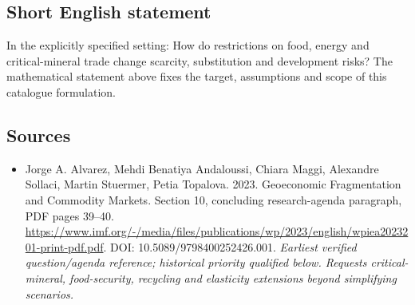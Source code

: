 \documentclass[11pt]{article}
\begin{document}
\subsection{Short English statement}
In the explicitly specified setting: How do restrictions on food, energy and critical-mineral trade change scarcity, substitution and development risks? The mathematical statement above fixes the target, assumptions and scope of this catalogue formulation.

\subsection{Sources}
\begin{itemize}\raggedright
\item[\textnormal{[S1]}]\hypertarget{source:30007630:1}{} Jorge A. Alvarez, Mehdi Benatiya Andaloussi, Chiara Maggi, Alexandre Sollaci, Martin Stuermer, Petia Topalova. 2023. Geoeconomic Fragmentation and Commodity Markets. Section 10, concluding research-agenda paragraph, PDF pages 39–40.
\url{https://www.imf.org/-/media/files/publications/wp/2023/english/wpiea2023201-print-pdf.pdf}.
DOI: 10.5089/9798400252426.001.
{\small\textit{Earliest verified question/agenda reference; historical priority qualified below. Requests critical-mineral, food-security, recycling and elasticity extensions beyond simplifying scenarios.}}
\end{itemize}
\end{document}
